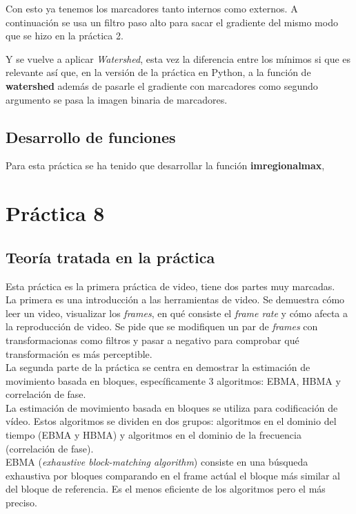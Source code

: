 \documentclass[a4paper,12pt]{report}
\begin{document}
Con esto ya tenemos los marcadores tanto internos como externos. A continuación se usa un filtro paso alto para sacar el gradiente del mismo modo que se hizo en la práctica 2. 

Y se vuelve a aplicar  \emph{Watershed}, esta vez la diferencia entre los mínimos si que es relevante así que, en la versión de la práctica en Python, a la función de \textbf{watershed} además de pasarle el gradiente con marcadores como segundo argumento se pasa la imagen binaria de marcadores.\\


\subsection{Desarrollo de funciones}

Para esta práctica se ha tenido que desarrollar la función \textbf{imregionalmax},
\section{ Práctica 8}
\subsection{Teoría tratada en la práctica}

Esta práctica es la primera práctica de video, tiene dos partes muy marcadas.\\

La primera es una introducción a las herramientas de video. Se demuestra cómo leer un video, visualizar los \emph{frames}, en qué consiste el \emph{frame rate} y cómo afecta a la reproducción de video. Se pide que se modifiquen un par de \emph{frames} con transformacionas como filtros y pasar a negativo para comprobar qué transformación es más perceptible.\\

La segunda parte de la práctica se centra en demostrar la estimación de movimiento basada en bloques, específicamente 3 algoritmos: EBMA, HBMA y correlación de fase.\\

La estimación de movimiento basada en bloques se utiliza para codificación de vídeo. Estos algoritmos se dividen en dos grupos: algoritmos en el dominio del tiempo (EBMA y HBMA) y algoritmos en el dominio de la frecuencia (correlación de fase).\\

EBMA (\emph{exhaustive block-matching algorithm}) consiste en una búsqueda exhaustiva por bloques comparando en el frame actúal el bloque más similar al del bloque de referencia. Es el menos eficiente de los algoritmos pero el más preciso.\\
\end{document}
